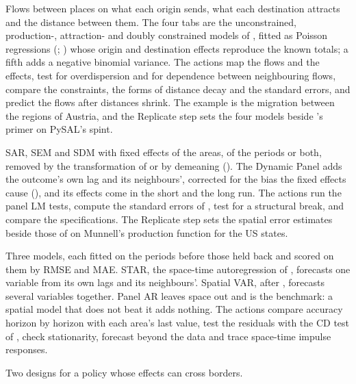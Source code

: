 Flows between places on what each origin sends, what each destination attracts and the distance between them. The four tabs are the unconstrained, production-, attraction- and doubly constrained models of , fitted as Poisson regressions (; ) whose origin and destination effects reproduce the known totals; a fifth adds a negative binomial variance. The actions map the flows and the effects, test for overdispersion and for dependence between neighbouring flows, compare the constraints, the forms of distance decay and the standard errors, and predict the flows after distances shrink. The example is the migration between the regions of Austria, and the Replicate step sets the four models beside 's primer on PySAL's spint.

SAR, SEM and SDM with fixed effects of the areas, of the periods or both, removed by the transformation of  or by demeaning (). The Dynamic Panel adds the outcome's own lag and its neighbours', corrected for the bias the fixed effects cause (), and its effects come in the short and the long run. The actions run the panel LM tests, compute the standard errors of , test for a structural break, and compare the specifications. The Replicate step sets the spatial error estimates beside those of  on Munnell's production function for the US states.

Three models, each fitted on the periods before those held back and scored on them by RMSE and MAE. STAR, the space-time autoregression of , forecasts one variable from its own lags and its neighbours'. Spatial VAR, after , forecasts several variables together. Panel AR leaves space out and is the benchmark: a spatial model that does not beat it adds nothing. The actions compare accuracy horizon by horizon with each area's last value, test the residuals with the CD test of , check stationarity, forecast beyond the data and trace space-time impulse responses.

Two designs for a policy whose effects can cross borders.

